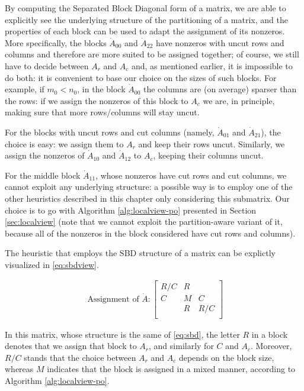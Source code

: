 By computing the Separated Block Diagonal form of a matrix, we are able to explicitly see the underlying structure of the partitioning of a matrix, and the properties of each block can be used to adapt the assignment of its nonzeros. More specifically, the blocks $\dot{A}_{00}$ and $\dot{A}_{22}$ have nonzeros with uncut rows and columns and therefore are more suited to be assigned together; of course, we still have to decide between $A_r$ and $A_c$ and, as mentioned earlier, it is impossible to do both: it is convenient to base our choice on the sizes of such blocks. For example, if $m_0 < n_0$, in the block $\dot{A}_{00}$ the columns are (on average) sparser than the rows: if we assign the nonzeros of this block to $A_c$ we are, in principle, making sure that more rows/columns will stay uncut.

For the blocks with uncut rows and cut columns (namely, $\dot{A}_{01}$ and $\dot{A}_{21}$), the choice is easy: we assign them to $A_r$ and keep their rows uncut. Similarly, we assign the nonzeros of $\dot{A}_{10}$ and $\dot{A}_{12}$ to $A_c$, keeping their columns uncut. 

For the middle block $\dot{A}_{11}$, whose nonzeros have cut rows and cut columns, we cannot exploit any underlying structure: a possible way is to employ one of the other heuristics described in this chapter only considering this submatrix. Our choice is to go with Algorithm \ref{alg:localview-po} presented in Section \ref{sec:localview} (note that we cannot exploit the partition-aware variant of it, because all of the nonzeros in the block considered have cut rows and columns).

The heuristic that employs the SBD structure of a matrix can be explictly visualized in \eqref{eq:sbdview}.

\begin{align}
	\text{	Assignment of } \dot{A}:	\begin{bmatrix}
		R/C & R & \\
		C & M & C \\
		& R & R/C \\
	\end{bmatrix}
	\label{eq:sbdview}
\end{align}

In this matrix, whose structure is the same of \eqref{eq:sbd}, the letter $R$ in a block denotes that we assign that block to $A_r$, and similarly for $C$ and $A_c$. Moreover, $R/C$ stands that the choice between $A_r$ and $A_c$ depends on the block size, whereas $M$ indicates that the block is assigned in a mixed manner, according to Algorithm \ref{alg:localview-po}.

